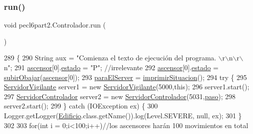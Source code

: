 \subsubsection{\texorpdfstring{run()}{run()}}
{\footnotesize\ttfamily void pecl6part2.\+Controlador.\+run (\begin{DoxyParamCaption}{ }\end{DoxyParamCaption})\hspace{0.3cm}{\ttfamily [inline]}}


\begin{DoxyCode}
289     \{
290          String aux = \textcolor{stringliteral}{"Comienza el texto de ejecución del programa. \(\backslash\)r\(\backslash\)n\(\backslash\)r\(\backslash\)n"};
291          \mbox{\hyperlink{classpecl6part2_1_1_controlador_ac2f7c4abd5447ea5daeeb7d62bf3f591}{ascensor}}[0].\mbox{\hyperlink{classpecl6part2_1_1_ascensor_a6a578a2c1bc59586257fe412a44354ac}{estado}} = \textcolor{stringliteral}{"P"}; \textcolor{comment}{//irrelevante}
292          \mbox{\hyperlink{classpecl6part2_1_1_controlador_ac2f7c4abd5447ea5daeeb7d62bf3f591}{ascensor}}[0].\mbox{\hyperlink{classpecl6part2_1_1_ascensor_a6a578a2c1bc59586257fe412a44354ac}{estado}} = \mbox{\hyperlink{classpecl6part2_1_1_controlador_a31e86324ff7658f72c803a7ac0c5af5b}{subirObajar}}(\mbox{\hyperlink{classpecl6part2_1_1_controlador_ac2f7c4abd5447ea5daeeb7d62bf3f591}{ascensor}}[0]);
293          \mbox{\hyperlink{classpecl6part2_1_1_controlador_a239e662ed9f4ba0e12f81e47f3f2773f}{paraElServer}} = \mbox{\hyperlink{classpecl6part2_1_1_controlador_a0a6c024e0bdec3f6d8092e0b716db729}{imprimirSituacion}}();
294          \textcolor{keywordflow}{try} \{
295             \mbox{\hyperlink{classpecl6part2_1_1_servidor_vigilante}{ServidorVigilante}} server1 = \textcolor{keyword}{new} \mbox{\hyperlink{classpecl6part2_1_1_servidor_vigilante}{ServidorVigilante}}(5000,\textcolor{keyword}{this});
296             server1.start();
297             \mbox{\hyperlink{classpecl6part2_1_1_servidor_controlador}{ServidorControlador}} server2 = \textcolor{keyword}{new} 
      \mbox{\hyperlink{classpecl6part2_1_1_servidor_controlador}{ServidorControlador}}(5031,\mbox{\hyperlink{classpecl6part2_1_1_controlador_ae07ed4d274035a923387361c19e5ce79}{paso}});
298             server2.start();
299         \} \textcolor{keywordflow}{catch} (IOException ex) \{
300             Logger.getLogger(\mbox{\hyperlink{classpecl6part1_1_1_edificio}{Edificio}}.class.getName()).log(Level.SEVERE, null, ex);
301         \}
302          
303             \textcolor{keywordflow}{for}(\textcolor{keywordtype}{int} i = 0;i<100;i++)\textcolor{comment}{//los ascensores harán 100 movimientos en total}

\end{DoxyCode}
